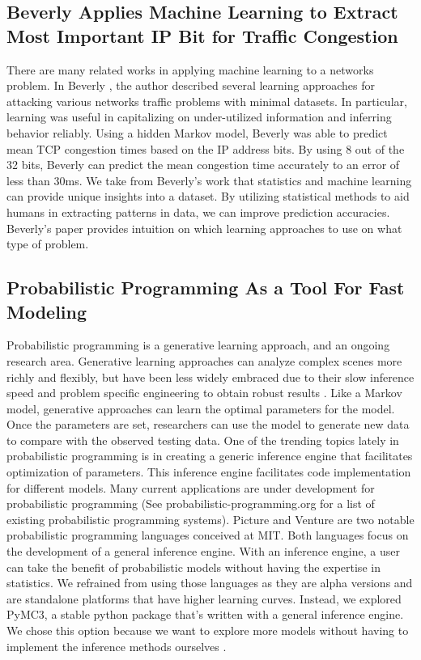 \documentclass[]{article}
\begin{document}
\subsection{Beverly Applies Machine Learning to Extract Most Important IP Bit for Traffic Congestion}
There are many related works in applying machine learning to a networks problem. In Beverly \cite{beverly}, the author described several learning approaches for attacking various networks traffic problems with minimal datasets. In particular, learning was useful in capitalizing on under-utilized information and inferring behavior reliably. Using a hidden Markov model, Beverly was able to predict mean TCP congestion times based on the IP address bits. By using 8 out of the 32 bits, Beverly can predict the mean congestion time accurately to an error of less than 30ms. We take from Beverly's work that statistics and machine learning can provide unique insights into a dataset. By utilizing statistical methods to aid humans in extracting patterns in data, we can improve prediction accuracies. Beverly's paper provides intuition on which learning approaches to use on what type of problem.

\subsection{Probabilistic Programming As a Tool For Fast Modeling}
Probabilistic programming is a generative learning approach, and an ongoing research area. Generative learning approaches can analyze complex scenes more richly and flexibly, but have been less widely embraced due to their slow inference speed and problem specific engineering to obtain robust results \cite{kulkarni}. Like a Markov model, generative approaches can learn the optimal parameters for the model. Once the parameters are set, researchers can use the model to generate new data to compare with the observed testing data. One of the trending topics lately in probabilistic programming is in creating a generic inference engine that facilitates optimization of parameters.  This inference engine facilitates code implementation for different models. Many current applications are under development for probabilistic programming \cite{pporg} (See probabilistic-programming.org for a list of existing probabilistic programming systems). Picture and Venture are two notable probabilistic programming languages conceived at MIT. Both languages focus on the development of a general inference engine. With an inference engine, a user can take the benefit of probabilistic models without having the expertise in statistics. We refrained from using those languages as they are alpha versions and are standalone platforms that have higher learning curves. Instead, we explored PyMC3, a stable python package that's written with a general inference engine. We chose this option because we want to explore more models without having to implement the inference methods ourselves \cite{ghah}. 
\end{document}
